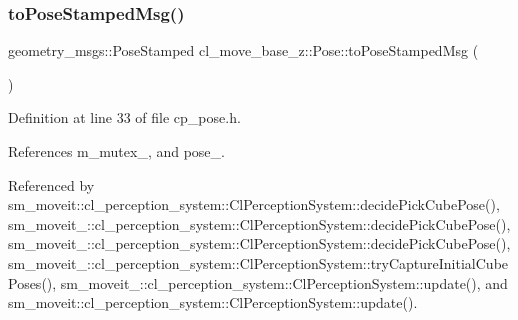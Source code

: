 \subsubsection{\texorpdfstring{to\+Pose\+Stamped\+Msg()}{toPoseStampedMsg()}}
{\footnotesize\ttfamily geometry\+\_\+msgs\+::\+Pose\+Stamped cl\+\_\+move\+\_\+base\+\_\+z\+::\+Pose\+::to\+Pose\+Stamped\+Msg (\begin{DoxyParamCaption}{ }\end{DoxyParamCaption})\hspace{0.3cm}{\ttfamily [inline]}}



Definition at line 33 of file cp\+\_\+pose.\+h.



References m\+\_\+mutex\+\_\+, and pose\+\_\+.



Referenced by sm\+\_\+moveit\+::cl\+\_\+perception\+\_\+system\+::\+Cl\+Perception\+System\+::decide\+Pick\+Cube\+Pose(), sm\+\_\+moveit\+\_\+::cl\+\_\+perception\+\_\+system\+::\+Cl\+Perception\+System\+::decide\+Pick\+Cube\+Pose(), sm\+\_\+moveit\+\_\+::cl\+\_\+perception\+\_\+system\+::\+Cl\+Perception\+System\+::decide\+Pick\+Cube\+Pose(), sm\+\_\+moveit\+\_\+::cl\+\_\+perception\+\_\+system\+::\+Cl\+Perception\+System\+::try\+Capture\+Initial\+Cube\+Poses(), sm\+\_\+moveit\+\_\+::cl\+\_\+perception\+\_\+system\+::\+Cl\+Perception\+System\+::update(), and sm\+\_\+moveit\+::cl\+\_\+perception\+\_\+system\+::\+Cl\+Perception\+System\+::update().


